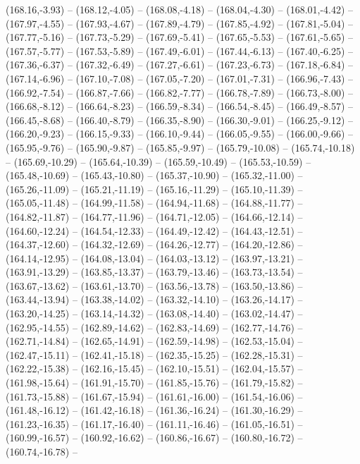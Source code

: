 {  (168.16,-3.93) -- (168.12,-4.05) -- (168.08,-4.18) -- (168.04,-4.30) -- (168.01,-4.42) -- (167.97,-4.55) -- (167.93,-4.67) --
  (167.89,-4.79) -- (167.85,-4.92) -- (167.81,-5.04) -- (167.77,-5.16) -- (167.73,-5.29) -- (167.69,-5.41) -- (167.65,-5.53) --
  (167.61,-5.65) -- (167.57,-5.77) -- (167.53,-5.89) -- (167.49,-6.01) -- (167.44,-6.13) -- (167.40,-6.25) -- (167.36,-6.37) --
  (167.32,-6.49) -- (167.27,-6.61) -- (167.23,-6.73) -- (167.18,-6.84) -- (167.14,-6.96) -- (167.10,-7.08) -- (167.05,-7.20) --
  (167.01,-7.31) -- (166.96,-7.43) -- (166.92,-7.54) -- (166.87,-7.66) -- (166.82,-7.77) -- (166.78,-7.89) -- (166.73,-8.00) --
  (166.68,-8.12) -- (166.64,-8.23) -- (166.59,-8.34) -- (166.54,-8.45) -- (166.49,-8.57) -- (166.45,-8.68) -- (166.40,-8.79) --
  (166.35,-8.90) -- (166.30,-9.01) -- (166.25,-9.12) -- (166.20,-9.23) -- (166.15,-9.33) -- (166.10,-9.44) -- (166.05,-9.55) --
  (166.00,-9.66) -- (165.95,-9.76) -- (165.90,-9.87) -- (165.85,-9.97) -- (165.79,-10.08) -- (165.74,-10.18) -- (165.69,-10.29) --
  (165.64,-10.39) -- (165.59,-10.49) -- (165.53,-10.59) -- (165.48,-10.69) -- (165.43,-10.80) -- (165.37,-10.90) -- (165.32,-11.00) --
  (165.26,-11.09) -- (165.21,-11.19) -- (165.16,-11.29) -- (165.10,-11.39) -- (165.05,-11.48) -- (164.99,-11.58) -- (164.94,-11.68) --
  (164.88,-11.77) -- (164.82,-11.87) -- (164.77,-11.96) -- (164.71,-12.05) -- (164.66,-12.14) -- (164.60,-12.24) -- (164.54,-12.33) --
  (164.49,-12.42) -- (164.43,-12.51) -- (164.37,-12.60) -- (164.32,-12.69) -- (164.26,-12.77) -- (164.20,-12.86) -- (164.14,-12.95) --
  (164.08,-13.04) -- (164.03,-13.12) -- (163.97,-13.21) -- (163.91,-13.29) -- (163.85,-13.37) -- (163.79,-13.46) -- (163.73,-13.54) --
  (163.67,-13.62) -- (163.61,-13.70) -- (163.56,-13.78) -- (163.50,-13.86) -- (163.44,-13.94) -- (163.38,-14.02) -- (163.32,-14.10) --
  (163.26,-14.17) -- (163.20,-14.25) -- (163.14,-14.32) -- (163.08,-14.40) -- (163.02,-14.47) -- (162.95,-14.55) -- (162.89,-14.62) --
  (162.83,-14.69) -- (162.77,-14.76) -- (162.71,-14.84) -- (162.65,-14.91) -- (162.59,-14.98) -- (162.53,-15.04) -- (162.47,-15.11) --
  (162.41,-15.18) -- (162.35,-15.25) -- (162.28,-15.31) -- (162.22,-15.38) -- (162.16,-15.45) -- (162.10,-15.51) -- (162.04,-15.57) --
  (161.98,-15.64) -- (161.91,-15.70) -- (161.85,-15.76) -- (161.79,-15.82) -- (161.73,-15.88) -- (161.67,-15.94) -- (161.61,-16.00) --
  (161.54,-16.06) -- (161.48,-16.12) -- (161.42,-16.18) -- (161.36,-16.24) -- (161.30,-16.29) -- (161.23,-16.35) -- (161.17,-16.40) --
  (161.11,-16.46) -- (161.05,-16.51) -- (160.99,-16.57) -- (160.92,-16.62) -- (160.86,-16.67) -- (160.80,-16.72) -- (160.74,-16.78) --
}
